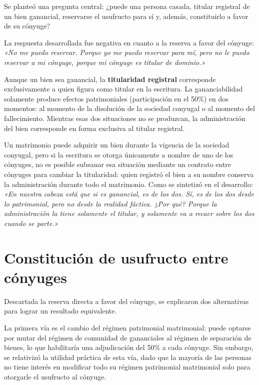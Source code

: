 \documentclass[12pt,oneside]{book}
\begin{document}
Se planteó una pregunta central: ¿puede una persona casada, titular registral de un bien ganancial, reservarse el usufructo para sí y, además, constituirlo a favor de su cónyuge?

La respuesta desarrollada fue negativa en cuanto a la reserva a favor del cónyuge: \textit{«No me puedo reservar. Porque yo me puedo reservar para mí, pero no le puedo reservar a mi cónyuge, porque mi cónyuge es titular de dominio.»}

\begin{important}
Aunque un bien sea ganancial, la \textbf{titularidad registral} corresponde exclusivamente a quien figura como titular en la escritura. La gananciabilidad solamente produce efectos patrimoniales (participación en el 50\%) en dos momentos: al momento de la disolución de la sociedad conyugal o al momento del fallecimiento. Mientras esas dos situaciones no se produzcan, la administración del bien corresponde en forma exclusiva al titular registral.
\end{important}

Un matrimonio puede adquirir un bien durante la vigencia de la sociedad conyugal, pero si la escritura se otorga únicamente a nombre de uno de los cónyuges, no es posible subsanar esa situación mediante un contrato entre cónyuges para cambiar la titularidad: quien registró el bien a su nombre conserva la administración durante todo el matrimonio. Como se sintetizó en el desarrollo: \textit{«En nuestra cabeza está que si es ganancial, es de los dos. Sí, es de los dos desde lo patrimonial, pero no desde la realidad fáctica. ¿Por qué? Porque la administración la tiene solamente el titular, y solamente va a recaer sobre los dos cuando se parte.»}


\section{Constitución de usufructo entre cónyuges}

Descartada la reserva directa a favor del cónyuge, se explicaron dos alternativas para lograr un resultado equivalente.

La primera vía es el cambio del régimen patrimonial matrimonial: puede optarse por mutar del régimen de comunidad de gananciales al régimen de separación de bienes, lo que habilitaría una adjudicación del 50\% a cada cónyuge. Sin embargo, se relativizó la utilidad práctica de esta vía, dado que la mayoría de las personas no tiene interés en modificar todo su régimen patrimonial matrimonial solo para otorgarle el usufructo al cónyuge.
\end{document}
